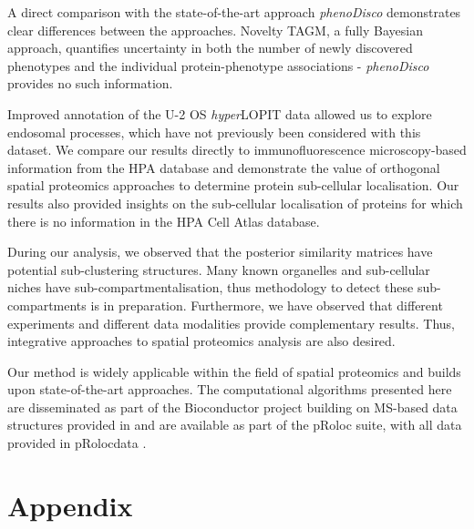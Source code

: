 \documentclass[12pt,english]{article}
\begin{document}
A direct comparison with the state-of-the-art approach \textit{phenoDisco} demonstrates clear differences between the approaches. Novelty TAGM, a fully Bayesian approach, quantifies uncertainty in both the number of newly discovered phenotypes and the individual protein-phenotype associations - \textit{phenoDisco} provides no such information.

Improved annotation of the U-2 OS \textit{hyper}LOPIT data allowed us to explore endosomal processes, which have not previously been considered with this dataset. We compare our results directly to immunofluorescence microscopy-based information from the HPA database and demonstrate the value of orthogonal spatial proteomics approaches to determine protein sub-cellular localisation. Our results also provided insights on the sub-cellular localisation of proteins for which there is no information in the HPA Cell Atlas database. 

During our analysis, we observed that the posterior similarity matrices have potential sub-clustering structures. Many known organelles and sub-cellular niches have sub-compartmentalisation, thus methodology to detect these sub-compartments is in preparation. Furthermore, we have observed that different experiments and different data modalities provide complementary results. Thus, integrative approaches to spatial proteomics analysis are also desired. 

Our method is widely applicable within the field of spatial proteomics and builds upon state-of-the-art approaches. The computational algorithms presented here are disseminated as part of the Bioconductor project \citep{Bioconductor::2004, Huber:2015} building on MS-based data structures provided in \cite{MSnbase:2012} and are available as part of the pRoloc suite, with all data provided in pRolocdata \citep{pRoloc:2014}.

\pagebreak
\section{Appendix}
\end{document}
